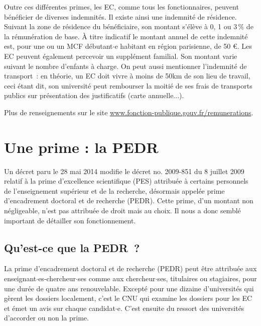 Outre ces diff\'erentes primes, les EC, comme tous les
fonctionnaires, peuvent b\'en\'eficier de diverses indemnit\'es. Il
existe ainsi une indemnit\'e de r\'esidence. Suivant la zone de
r\'esidence du b\'en\'eficiaire, son montant s'\'el\`eve \`a 0, 1 ou
3\,\% de la r\'emun\'eration de base. \`A titre indicatif le montant
annuel de cette indemnit\'e est, pour une ou un MCF d\'ebutant$\cdot$e habitant en
r\'egion parisienne, de 50 \euro{}. Les EC peuvent \'egalement
percevoir un suppl\'ement familial. Son montant varie suivant le
nombre d'enfants \`a charge. 
On peut aussi mentionner l'indemnit\'e de transport~: 
en th\'eorie, un EC doit vivre \`a moins de 50km de son lieu de travail, 
ceci \'etant dit, son universit\'e peut rembourser la moiti\'e de ses frais de transports publics sur pr\'esentation des justificatifs (carte annuelle...).


Plus de renseignements sur le site 
\url{www.fonction-publique.gouv.fr/remunerations}.


\section{Une prime : la PEDR}
\label{pedr}

Un d\'ecret paru le 28 mai 2014 modifie le d\'ecret no. 2009-851 du 8 juillet 2009 relatif \`a la prime d'excellence scientifique (PES) 
attribu\'ee \`a certains personnels de l'enseignement sup\'erieur et de la recherche, 
d\'esormais appel\'ee prime d'encadrement doctoral et de recherche (PEDR). 
Cette prime, d'un montant non n\'egligeable, n'est pas
attribu\'ee de droit mais au choix. Il nous a donc sembl\'e important de d\'etailler son fonctionnement.
% 

\subsection{Qu'est-ce que la PEDR~?}

La prime d'encadrement doctoral et de recherche (PEDR) peut \^etre
attribu\'ee aux enseignant$\cdot$es-cher\-cheur$\cdot$ses comme aux chercheur$\cdot$ses, titulaires ou stagiaires, pour une dur\'ee de quatre
ans renouvelable. Except\'e pour une dizaine d'universit\'es qui g\`erent les dossiers localement, c'est le CNU qui examine les dossiers pour les EC et \'emet un avis sur chaque candidat$\cdot$e. C'est ensuite du ressort des universit\'es d'accorder ou non la prime.


